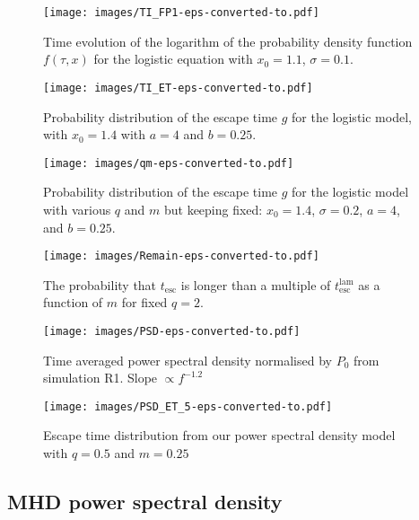 \documentclass[useAMS]{mn2e}
\begin{document}
\begin{figure}
\texttt{[image: images/TI\_FP1-eps-converted-to.pdf]}
\caption{Time evolution of the logarithm of the probability density
  function $f(\tau,x)$ for the logistic equation with $x_{0}=1.1$, $\sigma=0.1$.}
\label{Fig::TI_FP}
\end{figure}




\begin{figure}
\texttt{[image: images/TI\_ET-eps-converted-to.pdf]}
\caption{Probability distribution of the escape time $g$
  for the logistic model, with $x_{0}=1.4$ with $a=4$ and $b=0.25$.}
\label{Fig::TI_ET}
\end{figure}

\begin{figure}
\texttt{[image: images/qm-eps-converted-to.pdf]}
\caption{Probability distribution of the escape time $g$
  for the logistic model with various $q$ and $m$ but keeping fixed: 
   $x_{0}=1.4$, $\sigma=0.2$, $a=4$, and $b=0.25$.}
\label{Fig::qm_ET}
\end{figure}

\begin{figure}
\texttt{[image: images/Remain-eps-converted-to.pdf]}
\caption{The probability that $t_{\text{esc}}$ is longer than a
  multiple of $t_{\text{esc}}^{\text{lam}}$ as a function of $m$ for
  fixed $q=2$.}
\label{Fig::remain}
\end{figure}


\begin{figure}
\texttt{[image: images/PSD-eps-converted-to.pdf]}
\caption{Time averaged power spectral density normalised by $P_{0}$ from simulation R1. Slope $\propto f^{-1.2}$}
\label{Fig::PSD}
\end{figure}

\begin{figure}
\texttt{[image: images/PSD\_ET\_5-eps-converted-to.pdf]}
\caption{Escape time distribution from our power spectral density model with $q=0.5$ and $m=0.25$}
\label{Fig::PSD_ET}
\end{figure}



\subsection{MHD power spectral density}
\end{document}
